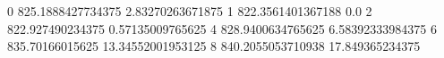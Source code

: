 0 825.1888427734375 2.83270263671875
1 822.3561401367188 0.0
2 822.927490234375 0.57135009765625
4 828.9400634765625 6.58392333984375
6 835.70166015625 13.34552001953125
8 840.2055053710938 17.849365234375
